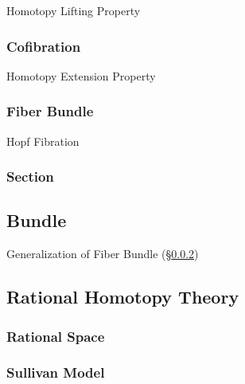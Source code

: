Homotopy Lifting Property



\subsubsection{Cofibration}\label{sec:cofibration}

Homotopy Extension Property



\subsubsection{Fiber Bundle}\label{sec:fiber_bundle}

Hopf Fibration



\subsubsection{Section}\label{sec:section}



\subsection{Bundle}\label{sec:bundle}

Generalization of Fiber Bundle (\S\ref{sec:fiber_bundle})



\subsection{Rational Homotopy Theory}\label{sec:rational_homotopy}

\subsubsection{Rational Space}\label{sec:rational_space}

\subsubsection{Sullivan Model}\label{sec:sullivan_model}



